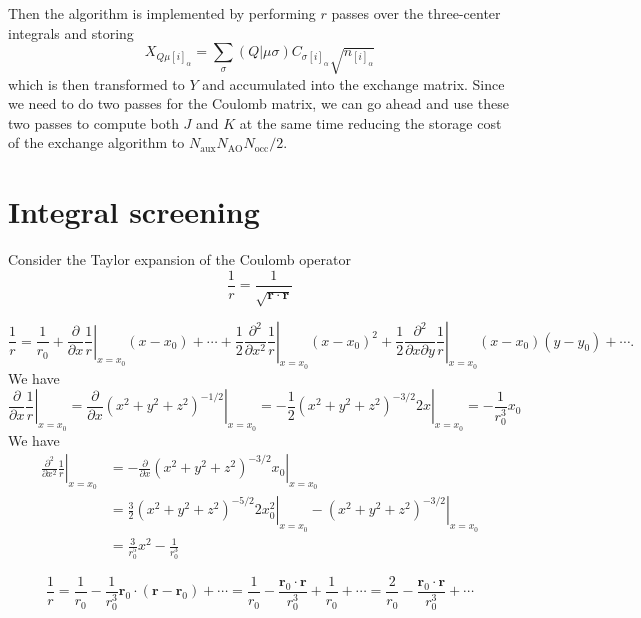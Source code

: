 \documentclass[aip,preprint]{revtex4-1}
\begin{document}
Then the algorithm is implemented by performing $r$ passes over the three-center integrals and storing
\begin{equation}
X_{Q \mu [i]_\alpha} = \sum_{\sigma} (Q | \mu \sigma) C_{\sigma [i]_\alpha}\sqrt{n_{[i]_\alpha}}
\end{equation}
which is then transformed to $Y$ and accumulated into the exchange matrix.
Since we need to do two passes for the Coulomb matrix, we can go ahead and use these two passes to compute both $J$ and $K$ at the same time reducing the storage cost of the exchange algorithm to $N_\mathrm{aux} N_{\mathrm{AO}} N_{\mathrm{occ}}/2$.

\section{Integral screening}

Consider the Taylor expansion of the Coulomb operator
\begin{equation}
\frac{1}{r} = \frac{1}{\sqrt{\mathbf{r}\cdot \mathbf{r}}}    
\end{equation}

\begin{equation}
\frac{1}{r} = \frac{1}{r_0}
+ \left. \frac{\partial}{\partial x}\frac{1}{r} \right|_{x = x_0} (x - x_0) + \cdots
+ \frac{1}{2}\left. \frac{\partial^2}{\partial x^2}\frac{1}{r} \right|_{x = x_0} (x - x_0)^2
+ \frac{1}{2}\left. \frac{\partial^2}{\partial x \partial y}\frac{1}{r} \right|_{x = x_0} (x - x_0)(y - y_0) + \cdots.
\end{equation}
We have 
\begin{equation}
\left. \frac{\partial}{\partial x}\frac{1}{r} \right|_{x = x_0}
=    
\left. \frac{\partial}{\partial x}(x^2 + y^2 + z^2)^{-1/2} \right|_{x = x_0}
=  -  
\left. \frac{1}{2}(x^2 + y^2 + z^2)^{-3/2} 2 x \right|_{x = x_0}
=-\frac{1}{r_0^3} x_0
\end{equation}
We have 
\begin{equation}
\begin{split}
\left. \frac{\partial^2}{\partial x^2}\frac{1}{r} \right|_{x = x_0}
& = -
\left. \frac{\partial}{\partial x}(x^2 + y^2 + z^2)^{-3/2} x_0 \right|_{x = x_0} \\
& = \frac{3}{2}\left. (x^2 + y^2 + z^2)^{-5/2} 2 x^2_0 \right|_{x = x_0}
 -
\left. (x^2 + y^2 + z^2)^{-3/2} \right|_{x = x_0} \\
&= \frac{3}{r_0^5} x^2 - \frac{1}{r_0^3}
\end{split}
\end{equation}


\begin{equation}
\frac{1}{r} = \frac{1}{r_0} - \frac{1}{r_0^3} \mathbf{r}_0 \cdot (\mathbf{r} - \mathbf{r}_0) + \cdots
=\frac{1}{r_0} - \frac{\mathbf{r}_0 \cdot \mathbf{r}}{r_0^3}
+ \frac{1}{r_0} + \cdots
= \frac{2}{r_0} - \frac{\mathbf{r}_0 \cdot \mathbf{r}}{r_0^3}
 + \cdots 
\end{equation}
\end{document}
